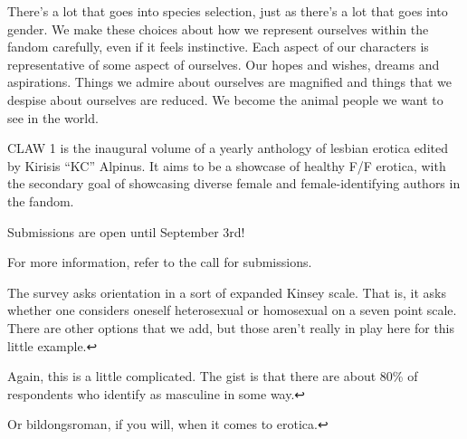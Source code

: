 There's a lot that goes into species selection, just as there's a lot that goes into gender. We make these choices about how we represent ourselves within the fandom carefully, even if it feels instinctive. Each aspect of our characters is representative of some aspect of ourselves. Our hopes and wishes, dreams and aspirations. Things we admire about ourselves are magnified and things that we despise about ourselves are reduced. We become the animal people we want to see in the world.

CLAW 1 is the inaugural volume of a yearly anthology of lesbian erotica edited by Kirisis ``KC'' Alpinus. It aims to be a showcase of healthy F/F erotica, with the secondary goal of showcasing diverse female and female-identifying authors in the fandom.

Submissions are open until September 3rd!

For more information, refer to the call for submissions.

The survey asks orientation in a sort of expanded Kinsey scale. That is, it asks whether one considers oneself heterosexual or homosexual on a seven point scale. There are other options that we add, but those aren't really in play here for this little example.↩

Again, this is a little complicated. The gist is that there are about 80\% of respondents who identify as masculine in some way.↩

Or bildongsroman, if you will, when it comes to erotica.↩
